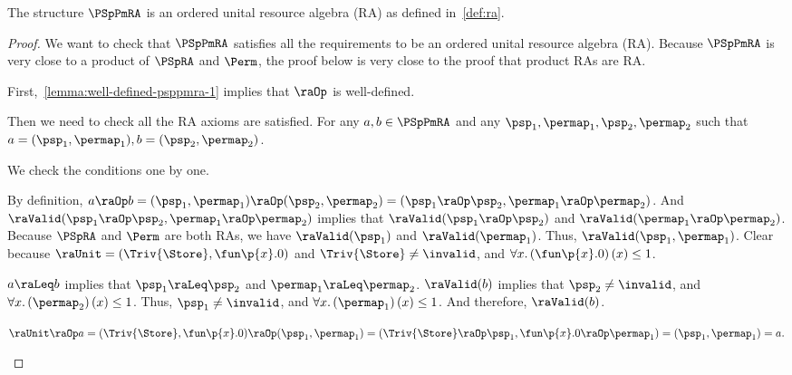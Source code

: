 \documentclass[acmsmall,nonacm,screen,appendix]{acmart}
\begin{document}
\begin{lemma}
  \label{lemma:psppm-ra}
  The structure $\PSpPmRA$ is an ordered unital resource algebra (RA) as defined
  in~\cref{def:ra}.
\end{lemma}

\begin{proof}
  We want to check that $\PSpPmRA$ satisfies all the requirements to be
  an ordered unital resource algebra (RA).
  Because $\PSpPmRA$ is very close to a product of $\PSpRA$ and $\Perm$,
  the proof below is very close to the proof that product RAs
  are RA.

  First,~\cref{lemma:well-defined-psppmra-1} implies that $\raOp$
  is well-defined.

  Then we need to check all the RA axioms are satisfied.
  For any $a, b \in \PSpPmRA$ and any $\psp_1, \permap_1, \psp_2, \permap_2$ such
  that $a = (\psp_1, \permap_1), b = (\psp_2, \permap_2)$.

  We check the conditions one by one.
  \begin{induction}
      By definition,
      $a \raOp b = (\psp_1, \permap_1) \raOp (\psp_2, \permap_2)
      = (\psp_1 \raOp \psp_2, \permap_1 \raOp \permap_2)$.
      And $\raValid(\psp_1 \raOp \psp_2, \permap_1 \raOp \permap_2)$
      implies that
      $\raValid(\psp_1 \raOp \psp_2)$ and
      $\raValid(\permap_1 \raOp \permap_2)$.
      Because $\PSpRA$ and $\Perm$ are both RAs,
      we have $\raValid(\psp_1)$ and $\raValid(\permap_1)$.
      Thus, $\raValid(\psp_1, \permap_1)$.
      Clear because $\raUnit = (\Triv{\Store}, \fun \p{x}. 0)$
      and $\Triv{\Store} \neq \invalid$, and
      $\forall x. \left(\fun \p{x}. 0\right)(x) \leq 1$.

      $a \raLeq b $ implies that
      $\psp_1 \raLeq \psp_2$ and $\permap_1 \raLeq \permap_2$.
      $\raValid(b)$ implies that
       $\psp_2 \neq \invalid$, and
      $\forall x. \left(\permap_2 \right)(x) \leq 1$.
      Thus,  $\psp_1 \neq \invalid$, and
      $\forall x. \left(\permap_1 \right)(x) \leq 1$.
      And therefore, $\raValid(b)$.

    \step[Condition~$\raUnit \raOp a = a$]
$
        \raUnit \raOp a
        = (\Triv{\Store}, \fun \p{x}. 0) \raOp (\psp_1, \permap_1) \\
        =  (\Triv{\Store} \raOp \psp_1,  \fun \p{x}. 0 \raOp \permap_1) \\
        = (\psp_1, \permap_1) = a.
      $


\end{induction}
\end{proof}
\end{document}
